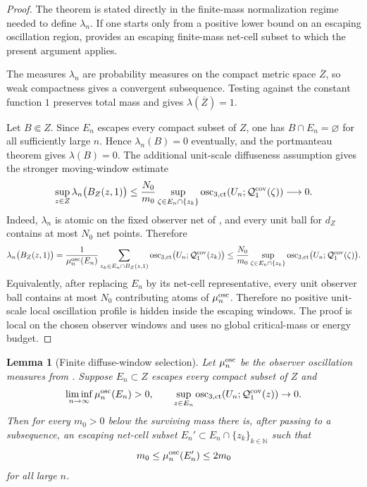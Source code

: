 \documentclass[11pt]{amsart}
\numberwithin{equation}{section}
\theoremstyle{plain}
\newtheorem{lemma}[lemma]{Lemma}
\theoremstyle{definition}
\theoremstyle{remark}
\newcommand{\actthree}{\operatorname{osc}_{3,\mathrm{ct}}}
\begin{document}
\begin{proof}
The theorem is stated directly in the finite-mass normalization regime needed
to define \(\lambda_n\).  If one starts only from a positive lower bound on an
escaping oscillation region, 
provides an escaping finite-mass net-cell subset to which the present argument
applies.

The measures \(\lambda_n\) are probability measures on the compact metric space
\(\overline Z\), so weak compactness gives a convergent subsequence.  Testing
against the constant function \(1\) preserves total mass and gives
\(\lambda(\overline Z)=1\).

Let \(B\Subset Z\).  Since \(E_n\) escapes every compact subset of \(Z\), one
has \(B\cap E_n=\varnothing\) for all sufficiently large \(n\).  Hence
\(\lambda_n(B)=0\) eventually, and the portmanteau theorem gives
\(\lambda(B)=0\).  The additional unit-scale diffuseness assumption gives the
stronger moving-window estimate
\[
   \sup_{z\in Z}
      \lambda_n\bigl(B_Z(z,1)\bigr)
   \le
   \frac{N_0}{m_0}
   \sup_{\zeta\in E_n\cap\{z_k\}}
      \actthree(U_n;\mathcal Q_1^{\rm cov}(\zeta))
   \longrightarrow0 .
\]
Indeed, \(\lambda_n\) is atomic on the fixed observer net of
, and every unit ball for \(d_Z\) contains at
most \(N_0\) net points.  Therefore
\[
   \lambda_n\bigl(B_Z(z,1)\bigr)
   =
   \frac{1}{\mu_n^{\rm osc}(E_n)}
   \sum_{z_k\in E_n\cap B_Z(z,1)}
      \actthree\bigl(U_n;\mathcal Q_1^{\rm cov}(z_k)\bigr)
   \le
   \frac{N_0}{m_0}
   \sup_{\zeta\in E_n\cap\{z_k\}}
      \actthree\bigl(U_n;\mathcal Q_1^{\rm cov}(\zeta)\bigr).
\]
Equivalently, after replacing \(E_n\) by its net-cell representative, every
unit observer ball contains at most \(N_0\) contributing atoms of
\(\mu_n^{\rm osc}\).
Therefore no positive unit-scale local oscillation profile is hidden inside the
escaping windows.  The proof is local on the chosen observer windows and uses no
global critical-mass or energy budget.
\end{proof}

\begin{lemma}[Finite diffuse-window selection]
\label{lem:finite-diffuse-window-selection}
Let \(\mu_n^{\rm osc}\) be the observer oscillation measures from
.  Suppose \(E_n\subset Z\) escapes every compact
subset of \(Z\) and
\[
   \liminf_{n\to\infty}\mu_n^{\rm osc}(E_n)>0,
   \qquad
   \sup_{z\in E_n}\actthree(U_n;\mathcal Q_1^{\rm cov}(z))\to0 .
\]
Then for every \(m_0>0\) below the surviving mass there is, after passing to a
subsequence, an escaping net-cell subset \(E_n'\subset E_n\cap\{z_k\}_{k\in\mathbb N}\)
such that
\[
   m_0\le \mu_n^{\rm osc}(E_n')\le 2m_0
\]
for all large \(n\).
\end{lemma}
\end{document}
